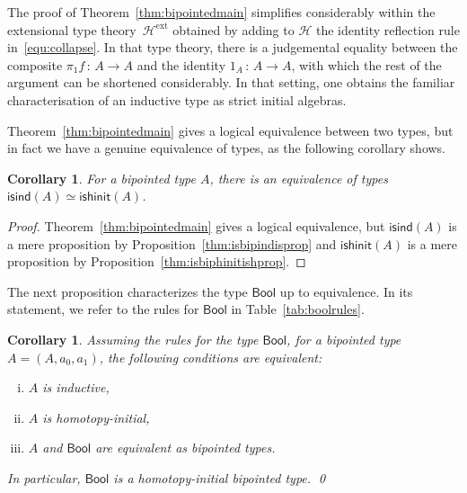 \documentclass[10pt,a4paper,oneside,reqno]{amsart}
\numberwithin{equation}{section}
\theoremstyle{mythm}
\newtheorem{corollary}[theorem]{Corollary}
\theoremstyle{mydef}
\theoremstyle{myrmk}
\newcommand{\co}{\,{:}\,}
\newcommand{\Hint}{\mathcal{H}}
\newcommand{\Hext}{\mathcal{H}^{\mathrm{ext}}}
\newcommand{\isbipind}{\mathsf{isind}}
\newcommand{\isbiphinit}{\mathsf{ishinit}}
\newcommand{\Bool}{\mathsf{Bool}}
\begin{document}
The proof of Theorem~\ref{thm:bipointedmain} simplifies considerably within the extensional
type theory~$\Hext$ obtained by adding to $\Hint$ the identity reflection rule in~\eqref{equ:collapse}. In that type theory, 
there is a judgemental equality 
between the composite $\pi_1 f \co A \to A$ and the identity $1_A \co A \to A$, with which the
rest of the argument can be shortened considerably. In that setting, one obtains the familiar characterisation 
of an inductive type as strict initial algebras.

\medskip

Theorem~\ref{thm:bipointedmain} gives a logical equivalence between two types, but in fact we 
have a genuine equivalence of types, as the following corollary shows.

\begin{corollary} For a bipointed type $A$, there is an equivalence of types $\isbipind(A)\simeq   \isbiphinit(A)$.
\end{corollary} 

\begin{proof} Theorem~\ref{thm:bipointedmain} gives a logical equivalence, but  $\isbipind(A)$ is a 
mere proposition by Proposition~\ref{thm:isbipindisprop} and $\isbiphinit(A)$ is a mere proposition
by Proposition~\ref{thm:isbiphinitishprop}. 
\end{proof}

The next proposition characterizes the
type $\Bool$ up to equivalence. In its statement, we refer to the rules for $\Bool$ in
Table~\ref{tab:boolrules}.



\begin{corollary} Assuming the rules for the type $\Bool$, for a bipointed type $A = (A, a_0, a_1)$, the following 
conditions are equivalent:
\begin{enumerate}[(i)]
\item $A$ is inductive,
\item $A$ is homotopy-initial,
\item $A$ and $\Bool$ are equivalent as bipointed types.
\end{enumerate}
In particular, $\Bool$ is a homotopy-initial bipointed type. \qed
\end{corollary}
\end{document}
